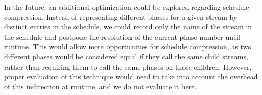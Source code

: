 

In the future, an additional optimization could be explored regarding
schedule compression.  Instead of representing different phases for a
given stream by distinct entries in the schedule, we could record only
the name of the stream in the schedule and postpone the resolution of
the current phase number until runtime.  This would allow more
opportunities for schedule compression, as two different phases would
be considered equal if they call the same child streams, rather than
requiring them to call the same phases on those children.  However,
proper evaluation of this technique would need to take into account
the overhead of this indirection at runtime, and we do not evaluate it
here.
